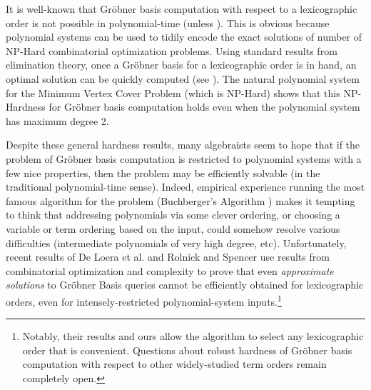 \documentclass{article}
\begin{document}
It is well-known that Gr\"{o}bner basis computation with respect to a lexicographic order is not possible in polynomial-time (unless ).  This is obvious because polynomial systems can be used to tidily encode the exact solutions of number of NP-Hard combinatorial optimization problems. Using standard results from elimination theory, once a Gr\"{o}bner basis for a lexicographic order is in hand, an optimal solution can be quickly computed (see \citep{Cox}). The natural polynomial system for the Minimum Vertex Cover Problem (which is NP-Hard) shows that this NP-Hardness for Gr\"{o}bner basis computation holds even when the polynomial system has maximum degree 2.

Despite these general hardness results, many algebraists seem to hope that if the problem of Gr\"{o}bner basis computation is restricted to polynomial systems with a few nice properties, then the problem may be efficiently solvable (in the traditional polynomial-time sense). Indeed, empirical experience running the most famous algorithm for the problem (Buchberger's Algorithm \cite{buch}) makes it tempting to think that addressing polynomials via some clever ordering, or choosing a variable or term ordering based on the input, could somehow resolve various difficulties (intermediate polynomials of very high degree, etc). Unfortunately, recent results of De Loera et al. \cite{deloera} and Rolnick and Spencer \cite{RS} use results from combinatorial optimization and complexity to prove that even \textit{approximate solutions} to Gr\"{o}bner Basis queries cannot be efficiently obtained for lexicographic orders, even for intensely-restricted polynomial-system inputs.\footnote{Notably, their results and ours allow the algorithm to select any lexicographic order that is convenient. Questions about robust hardness of Gr\"{o}bner basis computation with respect to other widely-studied term orders remain completely open.}
\end{document}
